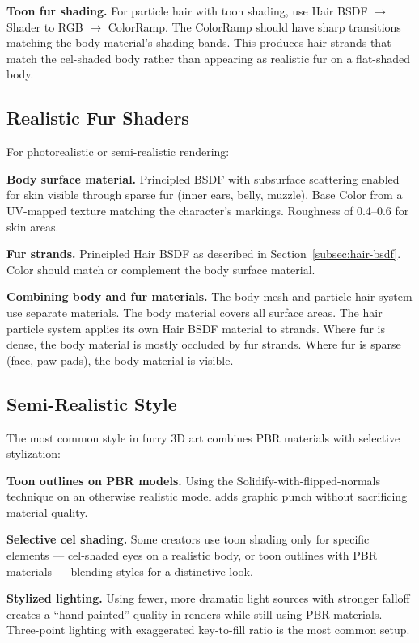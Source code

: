 \textbf{Toon fur shading.} For particle hair with toon shading, use Hair BSDF $\rightarrow$ Shader to RGB $\rightarrow$ ColorRamp. The ColorRamp should have sharp transitions matching the body material's shading bands. This produces hair strands that match the cel-shaded body rather than appearing as realistic fur on a flat-shaded body.


\subsection{Realistic Fur Shaders}

For photorealistic or semi-realistic rendering:

\textbf{Body surface material.} Principled BSDF with subsurface scattering enabled for skin visible through sparse fur (inner ears, belly, muzzle). Base Color from a UV-mapped texture matching the character's markings. Roughness of 0.4--0.6 for skin areas.

\textbf{Fur strands.} Principled Hair BSDF as described in Section~\ref{subsec:hair-bsdf}. Color should match or complement the body surface material.

\textbf{Combining body and fur materials.} The body mesh and particle hair system use separate materials. The body material covers all surface areas. The hair particle system applies its own Hair BSDF material to strands. Where fur is dense, the body material is mostly occluded by fur strands. Where fur is sparse (face, paw pads), the body material is visible.


\subsection{Semi-Realistic Style}

The most common style in furry 3D art combines PBR materials with selective stylization:

\textbf{Toon outlines on PBR models.} Using the Solidify-with-flipped-normals technique on an otherwise realistic model adds graphic punch without sacrificing material quality.

\textbf{Selective cel shading.} Some creators use toon shading only for specific elements --- cel-shaded eyes on a realistic body, or toon outlines with PBR materials --- blending styles for a distinctive look.

\textbf{Stylized lighting.} Using fewer, more dramatic light sources with stronger falloff creates a ``hand-painted'' quality in renders while still using PBR materials. Three-point lighting with exaggerated key-to-fill ratio is the most common setup.


